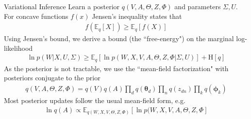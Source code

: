\documentclass[xcolor=dvipsnames]{beamer}
\newcommand \ent[1] {
    \text{H} \left[ #1 \right]
}
\newcommand \ex[2] {
    \mathbb{E}_{ { #2 } }\left[ #1 \right]
}
\newcommand \vv[1] { \boldsymbol #1 }
\newcommand \thd[0]  { { \vv \theta_d } }
\begin{document}
\begin{frame}{Variational Inference}
 {
    Learn a posterior $q(V,A,\Theta,Z,\Phi)$ and parameters $\Sigma, U$. \\
    \medskip
} {
    For concave functions $f(x)$ Jensen's inequality states that
    \begin{align*}
    f \left( \ex{X}{q} \right) \geq \ex{f(X)}{q}
    \end{align*}
}
 {
    Using Jensen's bound, we derive a bound (the ``free-energy") on the marginal log-likelihood
    \begin{align*}
    \ln p(W|X,U,\Sigma) \geq \ex{\ln p(W,X,V,A,\Theta,Z,\Phi | \Sigma, U)}{q} + \ent{q}
    \end{align*}
}
 {
    As the posterior is not tractable, we use the ``mean-field factorization" with posteriors conjugate to the prior
    \begin{align*}
    q(V,A,\Theta,Z,\Phi) = q(V)q(A)\prod_d q(\thd)\prod_n q(z_{dn}) \prod_k q(\vv{\phi}_k)
    \end{align*}
}
 {
    Most posterior updates follow the usual mean-field form, e.g.
    \begin{align*}
    \ln q(A) \propto \ex{\ln p(W,X,V,A,\Theta,Z,\Phi}{q(W,X,V,\Theta,Z,\Phi)}
    \end{align*}
}
\end{frame}


\end{document}
